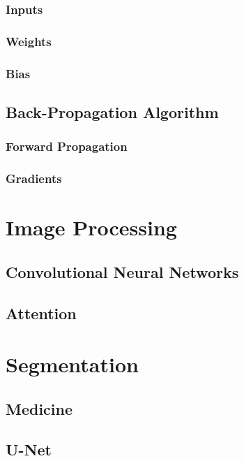 \documentclass{book}
\begin{document}
\begin{appendices}
      \subsubsection{Inputs}
      \subsubsection{Weights}
      \subsubsection{Bias}
    \subsection{Back-Propagation Algorithm}
      \subsubsection{Forward Propagation}
      \subsubsection{Gradients}
  \section{Image Processing}
    \subsection{Convolutional Neural Networks}
    \subsection{Attention}
  \section{Segmentation}
    \subsection{Medicine}
    \subsection{U-Net}
\end{appendices}



\end{document}
